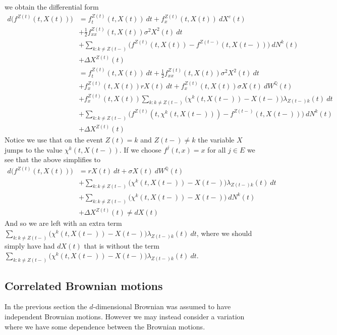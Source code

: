 \documentclass[a4paper,12pt,openany]{book}
\begin{document}
we obtain the differential form
\begin{align*}
d \Big(f^{Z(t)}(t,X(t))\Big)&=f_t^{Z(t)}(t,X(t))\ dt+f_x^{Z(t)}(t,X(t))\ dX^c(t)\\
&+\frac{1}{2}f^{Z(t)}_{xx}(t,X(t))\sigma^2X^2(t)\ dt\\
&+\sum_{k:k\ne Z(t-)}\Big(f^{Z(t)}(t,X(t))-f^{Z(t-)}(t,X(t-))\Big)\ dN^k(t)\\
&+\Delta X^{Z(t)}(t)\\
&=f_t^{Z(t)}(t,X(t))\ dt+\frac{1}{2}f^{Z(t)}_{xx}(t,X(t))\sigma^2X^2(t)\ dt\\
&+f_x^{Z(t)}(t,X(t))rX(t)\ dt+f_x^{Z(t)}(t,X(t))\sigma X(t)\ dW^\mathbb Q(t)\\
&+f_x^{Z(t)}(t,X(t))\sum_{k:k\ne Z(t-)}\Big(\chi^k(t,X(t-))-X(t-)\Big)\lambda_{Z(t-)k}(t)\ dt\\
&+\sum_{k:k\ne Z(t-)}\Big(f^{Z(t)}(t,\chi^k(t,X(t-)))-f^{Z(t-)}(t,X(t-))\Big)\ dN^k(t)\\
&+\Delta X^{Z(t)}(t)
\end{align*}
Notice we use that on the event \(Z(t)=k\) and \(Z(t-)\ne k\) the variable \(X\) jumps to the value \(\chi^k(t,X(t-))\). If we choose \(f^j(t,x)=x\) for all \(j\in E\) we see that the above simplifies to
\begin{align*}
d \Big(f^{Z(t)}(t,X(t))\Big)&=rX(t)\ dt+\sigma X(t)\ dW^\mathbb Q(t)\\
&+\sum_{k:k\ne Z(t-)}\Big(\chi^k(t,X(t-))-X(t-)\Big)\lambda_{Z(t-)k}(t)\ dt\\
&+\sum_{k:k\ne Z(t-)}\Big(\chi^k(t,X(t-))-X(t-))\ dN^k(t)\\
&+\Delta X^{Z(t)}(t)\ne dX(t)
\end{align*}
And so we are left with an extra term \(\sum_{k:k\ne Z(t-)}\Big(\chi^k(t,X(t-))-X(t-)\Big)\lambda_{Z(t-)k}(t)\ dt\), where we should simply have had \(dX(t)\) that is without the term \(\sum_{k:k\ne Z(t-)}\Big(\chi^k(t,X(t-))-X(t-)\Big)\lambda_{Z(t-)k}(t)\ dt\).

\hypertarget{correlated-brownian-motions}{%
\subsection{Correlated Brownian motions}\label{correlated-brownian-motions}}

In the previous section the \(d\)-dimensional Brownian was assumed to have independent Brownian motions. However we may instead consider a variation where we have some dependence between the Brownian motions.
\end{document}
